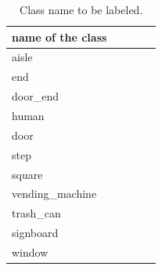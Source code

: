 \documentclass[../main]{subfiles}
\begin{document}
        \begin{table}[H]
            \caption{Class name to be labeled.}
            \centering
            \label{table::datasets_table}
            \begin{tabular}{lllll}
            \hline
            name of the class &  &  &  &  \\ 
            \hline \hline
            aisle             &  &  &  &  \\
            end               &  &  &  &  \\
            door\_end         &  &  &  &  \\
            human             &  &  &  &  \\
            door              &  &  &  &  \\
            step              &  &  &  &  \\
            square            &  &  &  &  \\
            vending\_machine  &  &  &  &  \\
            trash\_can        &  &  &  &  \\
            signboard         &  &  &  &  \\
            window            &  &  &  &  \\ 
            \hline
            \end{tabular}
        \end{table}
\end{document}

